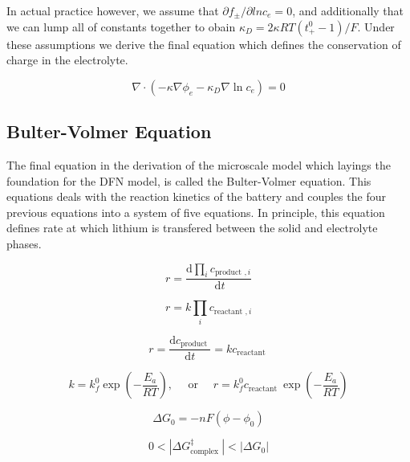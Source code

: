 \documentclass[lettersize,journal]{IEEEtran}
\begin{document}
\noindent In actual practice however, we assume that $\partial{f_{\pm}}/\partial ln {c_e} = 0 $, and additionally that we can lump all of constants together to obain $\kappa_{D}=2 \kappa R T\left(t_{+}^{0}-1\right) / F$. Under these assumptions we derive the final equation which defines the conservation of charge in the electrolyte.

\begin{equation}
\nabla \cdot\left(-\kappa \nabla \phi_{e}-\kappa_{D} \nabla \ln c_{e}\right)=0
\end{equation}


\subsection{Bulter-Volmer Equation}
The final equation in the derivation of the microscale model which layings the foundation for the DFN model, is called the Bulter-Volmer equation. This equations deals with the reaction kinetics of the battery and couples the four previous equations into a system of five equations. In principle, this equation defines rate at which lithium is transfered between the solid and electrolyte phases.

\begin{equation}
r=\frac{\mathrm{d} \prod_{i} c_{\text {product }, i}}{\mathrm{~d} t}
\end{equation}

\begin{equation}
r=k \prod_{i} c_{\text {reactant }, i}
\end{equation}

\begin{equation}
r=\frac{\mathrm{d} c_{\text {product }}}{\mathrm{d} t}=k c_{\text {reactant }}
\end{equation}

\begin{equation}
k=k_{f}^{0} \exp \left(-\frac{E_{a}}{R T}\right), \quad \text { or } \quad r=k_{f}^{0} c_{\text {reactant }} \exp \left(-\frac{E_{a}}{R T}\right)
\end{equation}

\begin{equation}
\Delta G_{0}=-n F\left(\phi-\phi_{0}\right)
\end{equation}

\begin{equation}
0<\left|\Delta G_{\text {complex }}^{\ddagger}\right|<\left|\Delta G_{0}\right|
\end{equation}
\end{document}
